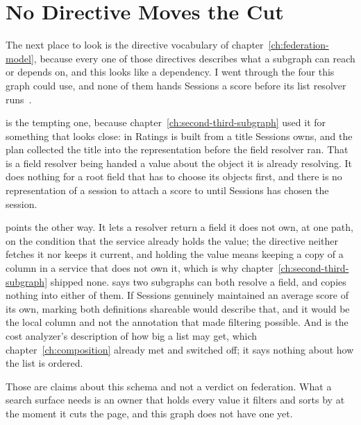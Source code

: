 \section{No Directive Moves the Cut}
\label{sec:ch13-no-directive-moves-the-cut}

%
The next place to look is the directive vocabulary of
chapter~\ref{ch:federation-model}, because every one of those directives
describes what a subgraph can reach or depends on, and this looks like a
dependency. I went through the four this graph could use, and none of them
hands Sessions a score before its list resolver
runs~\autocite{apollodirectives}.

%
 is the tempting one, because
chapter~\ref{ch:second-third-subgraph} used it for something that looks close:
 in Ratings is built from a title Sessions owns, and the
plan collected the title into the representation before the field resolver
ran. That is a field resolver being handed a value about the object it is
already resolving. It does nothing for a root field that has to choose its
objects first, and there is no representation of a session to attach a score
to until Sessions has chosen the session.

%
 points the other way. It lets a resolver return a field it
does not own, at one path, on the condition that the service already holds
the value; the directive neither fetches it nor keeps it current, and holding
the value means keeping a copy of a column in a service that does not own it,
which is why chapter~\ref{ch:second-third-subgraph} shipped none.
 says two subgraphs can both resolve a field, and
copies nothing into either of them. If Sessions genuinely maintained an
average score of its own, marking both definitions shareable would describe
that, and it would be the local column and not the annotation that made
filtering possible. And  is the cost analyzer's description of
how big a list may get, which chapter~\ref{ch:composition} already met and
switched off; it says nothing about how the list is ordered.

%
Those are claims about this schema and not a verdict on federation. What a
search surface needs is an owner that holds every value it filters and sorts
by at the moment it cuts the page, and this graph does not have one yet.

